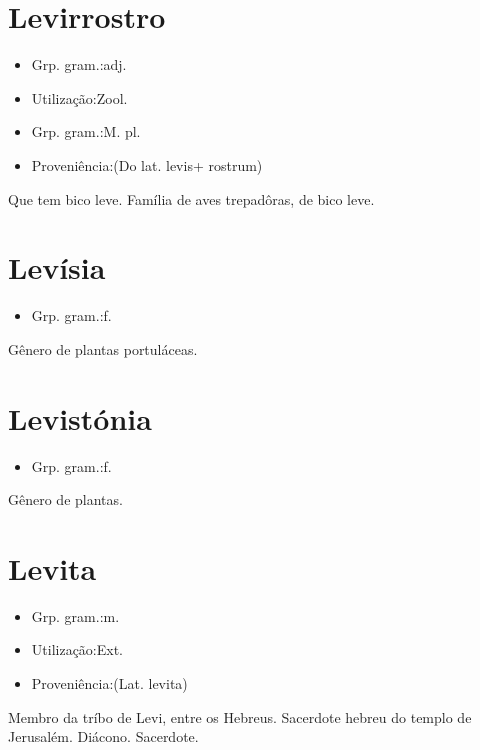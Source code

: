 \section{Levirrostro}
\begin{itemize}
\item {Grp. gram.:adj.}
\end{itemize}
\begin{itemize}
\item {Utilização:Zool.}
\end{itemize}
\begin{itemize}
\item {Grp. gram.:M. pl.}
\end{itemize}
\begin{itemize}
\item {Proveniência:(Do lat. \textunderscore levis\textunderscore  + \textunderscore rostrum\textunderscore )}
\end{itemize}
Que tem bico leve.
Família de aves trepadôras, de bico leve.
\section{Levísia}
\begin{itemize}
\item {Grp. gram.:f.}
\end{itemize}
Gênero de plantas portuláceas.
\section{Levistónia}
\begin{itemize}
\item {Grp. gram.:f.}
\end{itemize}
Gênero de plantas.
\section{Levita}
\begin{itemize}
\item {Grp. gram.:m.}
\end{itemize}
\begin{itemize}
\item {Utilização:Ext.}
\end{itemize}
\begin{itemize}
\item {Proveniência:(Lat. \textunderscore levita\textunderscore )}
\end{itemize}
Membro da tríbo de Levi, entre os Hebreus.
Sacerdote hebreu do templo de Jerusalém.
Diácono.
Sacerdote.
